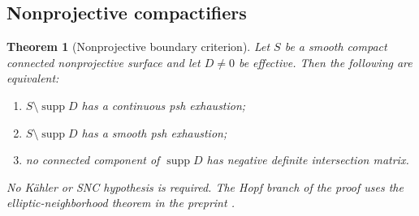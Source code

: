 \documentclass[11pt]{amsart}
\newtheorem{theorem}{Theorem}[section]
\theoremstyle{definition}
\theoremstyle{remark}
\numberwithin{equation}{section}
\newcommand{\supp}{\operatorname{supp}}
\begin{document}
\subsection{Nonprojective compactifiers}\label{sec:surface-nonprojective}

\begin{theorem}[Nonprojective boundary criterion]\label{thm:nonprojective}
Let $S$ be a smooth compact connected nonprojective surface and let
$D\ne0$ be effective. Then the following are equivalent:
\begin{enumerate}[label=\textup{(\roman*)},leftmargin=2.5em]
\item $S\setminus\supp D$ has a continuous psh exhaustion;
\item $S\setminus\supp D$ has a smooth psh exhaustion;
\item no connected component of $\supp D$ has negative definite
intersection matrix.
\end{enumerate}
No K\"ahler or SNC hypothesis is required. The Hopf branch of the
proof uses the elliptic-neighborhood theorem in the preprint
\cite[Theorem~1.6]{CFSTZ2026}.
\end{theorem}
\end{document}
